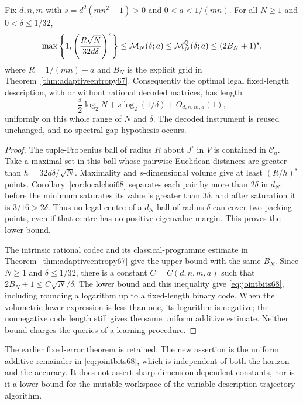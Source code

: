 \begin{theorem}\label{thm:jointcode68}
Fix $d,n,m$ with $s=d^2(mn^2-1)>0$ and $0<a<1/(mn)$.
For all $N\ge1$ and $0<\delta\le1/32$,
\begin{equation}\label{eq:jointcode68}
 \max\left\{1,\left(\frac{R\sqrt N}{32d\delta}\right)^s\right\}
 \le\mathcal M_N(\delta;a)
 \le\mathcal M_N^{\mathbb Q}(\delta;a)\le(2B_N+1)^s,
\end{equation}
where $R=1/(mn)-a$ and $B_N$ is the explicit grid in
Theorem~\ref{thm:adaptiveentropy67}. Consequently the optimal legal
fixed-length description, with or without rational decoded matrices,
has length
\begin{equation}\label{eq:jointbits68}
 \frac s2\log_2N+s\log_2(1/\delta)+O_{d,n,m,a}(1),
\end{equation}
uniformly on this whole range of $N$ and $\delta$. The decoded
instrument is reused unchanged, and no spectral-gap hypothesis occurs.
\end{theorem}
\begin{proof}
The tuple-Frobenius ball of radius $R$ about $J^\circ$ in $V$ is
contained in $\mathcal C_a$. Take a maximal set in this ball whose
pairwise Euclidean distances are greater than
$h=32d\delta/\sqrt N$. Maximality and $s$-dimensional volume give at
least $(R/h)^s$ points. Corollary~\ref{cor:localchoi68} separates
each pair by more than $2\delta$ in $d_N$: before the minimum saturates
its value is greater than $3\delta$, and after saturation it is
$3/16>2\delta$. Thus no legal centre of a $d_N$-ball of radius
$\delta$ can cover two packing points, even if that centre has no
positive eigenvalue margin. This proves the lower bound.

The intrinsic rational codec and its classical-programme estimate in
Theorem~\ref{thm:adaptiveentropy67} give the upper bound with the
same $B_N$. Since $N\ge1$ and $\delta\le1/32$, there is a constant
$C=C(d,n,m,a)$ such that $2B_N+1\le C\sqrt N/\delta$. The lower
bound and this inequality give \eqref{eq:jointbits68}, including
rounding a logarithm up to a fixed-length binary code. When the
volumetric lower expression is less than one, its logarithm is negative;
the nonnegative code length still gives the same uniform additive
estimate. Neither bound charges the queries of a learning procedure.
\end{proof}
The earlier fixed-error theorem is retained. The new assertion is the
uniform additive remainder in \eqref{eq:jointbits68}, which is
independent of both the horizon and the accuracy. It does not assert
sharp dimension-dependent constants, nor is it a lower bound for the
mutable workspace of the variable-description trajectory algorithm.
